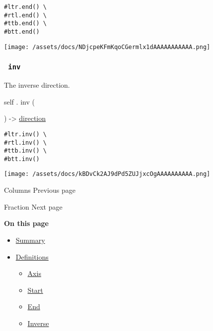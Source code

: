 \begin{verbatim}
#ltr.end() \
#rtl.end() \
#ttb.end() \
#btt.end()
\end{verbatim}

\texttt{[image: /assets/docs/NDjcpeKFmKqoCGermlx1dAAAAAAAAAAA.png]}

\subsubsection{\texorpdfstring{\texttt{\ inv\ }}{ inv }}\label{definitions-inv}

The inverse direction.

self { . } { inv } (

) -\textgreater{} \href{/docs/reference/layout/direction/}{direction}

\begin{verbatim}
#ltr.inv() \
#rtl.inv() \
#ttb.inv() \
#btt.inv()
\end{verbatim}

\texttt{[image: /assets/docs/kBDvCk2AJ9dPd5ZUJjxcOgAAAAAAAAAA.png]}

\href{/docs/reference/layout/columns/}{\pandocbounded{}}

{ Columns } { Previous page }

\href{/docs/reference/layout/fraction/}{\pandocbounded{}}

{ Fraction } { Next page }

\textbf{On this page}

\begin{itemize}
\tightlist
\item
  \hyperref[summary]{Summary}
\item
  \hyperref[definitions]{Definitions}

  \begin{itemize}
  \tightlist
  \item
    \hyperref[definitions-axis]{Axis}
  \item
    \hyperref[definitions-start]{Start}
  \item
    \hyperref[definitions-end]{End}
  \item
    \hyperref[definitions-inv]{Inverse}
  \end{itemize}
\end{itemize}

